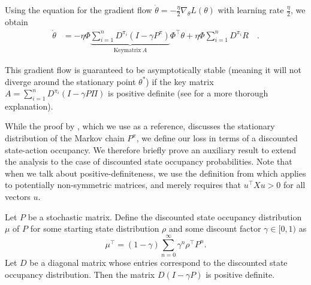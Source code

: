Using the equation for the gradient flow $\dot{\theta} = - \frac{\eta}{2} \nabla_\theta L(\theta)$ with learning rate $\frac{\eta}{2}$, we obtain
\begin{align}
    \dot\theta &= - \eta \Phi \underbrace{\sum_{i=1}^n D^{\pi_i} \left(I - \gamma P^\pi \right)}_{\mathrm{Key matrix}~A}\Phi^\top \theta + \eta \Phi \sum_{i=1}^n D^{\pi_i} R\quad.
\end{align}

This gradient flow is guaranteed to be asymptotically stable (meaning it will not diverge around the stationary point $\theta^*$) if the key matrix $A = \sum_{i=1}^n D^{\pi_i} \left(I - \gamma P \Pi \right)$ is positive definite (see \textcite{sutton1988learning} for a more thorough explanation). 

While the proof by \textcite{sutton1988learning}, which we use as a reference, discusses the stationary distribution of the Markov chain $P^\pi$, we define our loss in terms of a discounted state-action occupancy. 
We therefore briefly prove an auxiliary result to extend the analysis to the case of discounted state occupancy probabilities.
Note that when we talk about positive-definiteness, we use the definition from \textcite{sutton1988learning} which applies to potentially non-symmetric matrices, and merely requires that $u^\top X u > 0$ for all vectors $u$.

\begin{lemma}
\label{prop:aux}
Let $P$ be a stochastic matrix. Define the discounted state occupancy distribution $\mu$ of $P$ for some starting state distribution $\rho$ and some discount factor $\gamma \in [0,1)$ as $$\mu^\top = (1 - \gamma) \sum_{n=0}^\infty \gamma^n \rho^\top P^n.$$ Let $D$ be a diagonal matrix whose entries correspond to the discounted state occupancy distribution.
Then the matrix $D(I - \gamma P)$ is positive definite.
\end{lemma}

